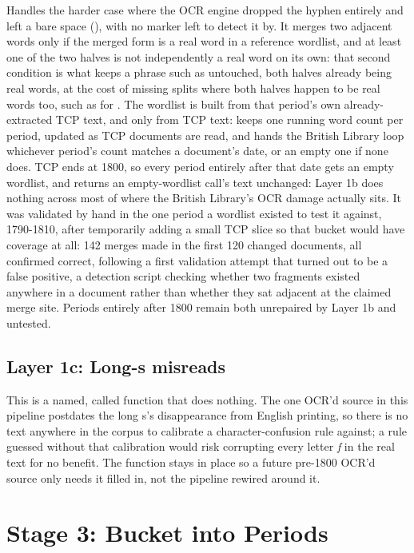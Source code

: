 \documentclass[11pt]{article}
\begin{document}
Handles the harder case where
the OCR engine dropped the hyphen entirely and left a bare space
(), with no marker left to detect it by. It merges
two adjacent words only if the merged form is a real word in a reference
wordlist, and at least one of the two halves is not independently a real
word on its own: that second condition is what keeps a phrase such as
 untouched, both halves already being real words, at
the cost of missing splits where both halves happen to be real words
too, such as  for . The wordlist is built
from that period's own already-extracted TCP text, and only from TCP
text:  keeps one running word count per period,
updated as TCP documents are read, and hands the British Library loop
whichever period's count matches a document's date, or an empty one if
none does. TCP ends at 1800, so every period entirely after that date
gets an empty wordlist, and  returns
an empty-wordlist call's text unchanged: Layer 1b does nothing across
most of where the British Library's OCR damage actually sits. It was
validated by hand in the one period a wordlist existed to test it
against, 1790-1810, after temporarily adding a small TCP slice so that
bucket would have coverage at all: 142 merges made in the first 120
changed documents, all confirmed correct, following a first validation attempt that
turned out to be a false positive, a detection script checking whether
two fragments existed anywhere in a document rather than whether they
sat adjacent at the claimed merge site. Periods entirely after 1800
remain both unrepaired by Layer 1b and untested.

\subsection{Layer 1c: Long-s misreads}

This is a named, called function that does
nothing. The one OCR'd source in this pipeline postdates the long s's
disappearance from English printing, so there is no text anywhere in the
corpus to calibrate a character-confusion rule against; a rule guessed
without that calibration would risk corrupting every letter \emph{f} in
the real text for no benefit. The function stays in place so a future
pre-1800 OCR'd source only needs it filled in, not the pipeline rewired
around it.

\section{Stage 3: Bucket into Periods}
\end{document}
